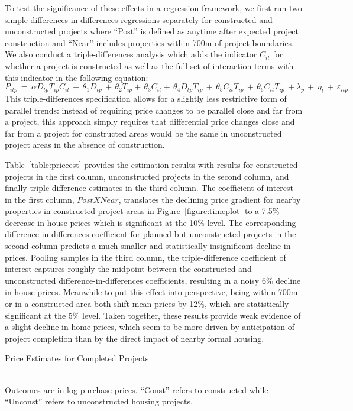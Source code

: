 \documentclass[12pt]{article}
\begin{document}
To test the significance of these effects in a regression framework, we first run two simple differences-in-differences regressions separately for constructed and unconstructed projects where ``Post'' is defined as anytime after expected project construction and ``Near'' includes properties within 700m of project boundaries.  We also conduct a triple-differences analysis which adds the indicator $C_{it}$ for whether a project is constructed as well as the full set of interaction terms with this indicator in the following equation:
\begin{equation*}
P_{itp} \, = \, \alpha D_{tp}T_{ip} C_{it} \, + \,\theta_1 D_{tp} \, + \, \theta_2 T_{ip}+ \, \theta_3 C_{it}+ \, \theta_4 D_{tp} T_{ip} \, + \, \theta_5 C_{it} T_{ip}  \, + \, \theta_6 C_{it} T_{ip} \, +  \lambda_p \,  + \, \eta_{t} \, + \, \varepsilon_{itp}
\end{equation*}
This triple-differences specification allows for a slightly less restrictive form of parallel trends: instead of requiring price changes to be parallel close and far from a project, this approach simply requires that differential price changes close and far from a project for constructed areas would be the same in unconstructed project areas in the absence of construction.  

Table~\ref{table:priceest} provides the estimation results with results for constructed projects in the first column, unconstructed projects in the second column, and finally triple-difference estimates in the third column.  The coefficient of interest in the first column, $Post X Near$, translates the declining price gradient for nearby properties in constructed project areas in Figure~\ref{figure:timeplot} to a 7.5\% decrease in house prices which is significant at the 10\% level.  The corresponding difference-in-differences coefficient for planned but unconstructed projects in the second column predicts a much smaller and statistically insignificant decline in prices.  Pooling samples in the third column, the triple-difference coefficient of interest captures roughly the midpoint between the constructed and unconstructed difference-in-differences coefficients, resulting in a noisy 6\% decline in house prices.  Meanwhile to put this effect into perspective, being within 700m or in a constructed area both shift mean prices by 12\%, which are statistically significant at the 5\% level.  Taken together, these results provide weak evidence of a slight decline in home prices, which seem to be more driven by anticipation of project completion than by the direct impact of nearby formal housing.
\begin{table}
\caption{Price Estimates for Completed Projects}\label{table:priceest}
\centering
 \\
\footnotesize{Outcomes are in log-purchase prices. ``Const'' refers to constructed while \\ ``Unconst'' refers to unconstructed housing projects.}
\end{table}
\end{document}
